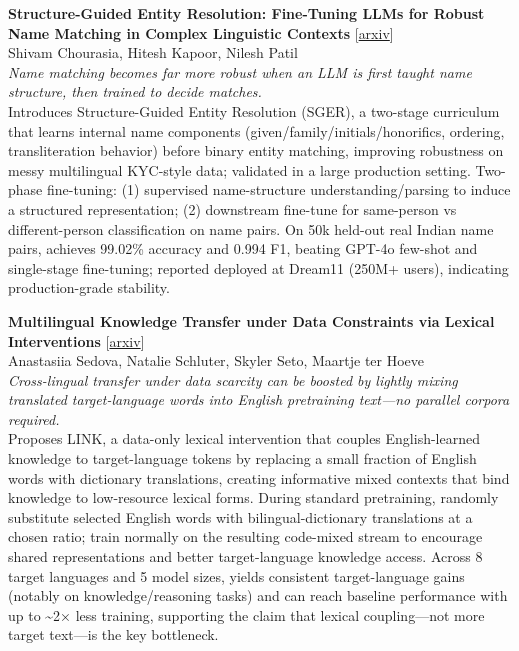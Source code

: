 \documentclass[12pt,letterpaper]{article}
\begin{document}
\medskip

{\small\textbf{Structure-Guided Entity Resolution: Fine-Tuning LLMs for Robust Name Matching in Complex Linguistic Contexts}} {\scriptsize[\href{https://arxiv.org/abs/2605.23597}{arxiv}]}\\
{\scriptsize Shivam Chourasia, Hitesh Kapoor, Nilesh Patil}\\

{\small\textit{Name matching becomes far more robust when an LLM is first taught name structure, then trained to decide matches.}}\\[1pt]
{\footnotesize Introduces Structure-Guided Entity Resolution (SGER), a two-stage curriculum that learns internal name components (given/family/initials/honorifics, ordering, transliteration behavior) before binary entity matching, improving robustness on messy multilingual KYC-style data; validated in a large production setting. Two-phase fine-tuning: (1) supervised name-structure understanding/parsing to induce a structured representation; (2) downstream fine-tune for same-person vs different-person classification on name pairs. On 50k held-out real Indian name pairs, achieves 99.02\% accuracy and 0.994 F1, beating GPT-4o few-shot and single-stage fine-tuning; reported deployed at Dream11 (250M+ users), indicating production-grade stability.}

\medskip

{\small\textbf{Multilingual Knowledge Transfer under Data Constraints via Lexical Interventions}} {\scriptsize[\href{https://arxiv.org/abs/2605.23885}{arxiv}]}\\
{\scriptsize Anastasiia Sedova, Natalie Schluter, Skyler Seto, Maartje ter Hoeve}\\

{\small\textit{Cross-lingual transfer under data scarcity can be boosted by lightly mixing translated target-language words into English pretraining text---no parallel corpora required.}}\\[1pt]
{\footnotesize Proposes LINK, a data-only lexical intervention that couples English-learned knowledge to target-language tokens by replacing a small fraction of English words with dictionary translations, creating informative mixed contexts that bind knowledge to low-resource lexical forms. During standard pretraining, randomly substitute selected English words with bilingual-dictionary translations at a chosen ratio; train normally on the resulting code-mixed stream to encourage shared representations and better target-language knowledge access. Across 8 target languages and 5 model sizes, yields consistent target-language gains (notably on knowledge/reasoning tasks) and can reach baseline performance with up to \textasciitilde{}2× less training, supporting the claim that lexical coupling---not more target text---is the key bottleneck.}
\end{document}
